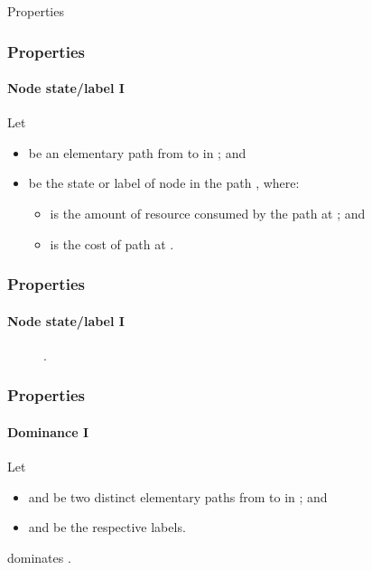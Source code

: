 \begin{frame}
  \begin{center}
    \Huge Properties
  \end{center}
\end{frame}

\begin{frame}
  \frametitle{Properties}
  \framesubtitle{Node state/label I}
  Let
  \begin{itemize}
    \item {} be an elementary path from  to  in ; and 
    \item {} be the state or label of node  in the path , where:
    \begin{itemize}
      \item {} is the amount of resource  consumed by the path  at ; and 
      \item {} is the cost of path  at .
    \end{itemize}
  \end{itemize}
\end{frame}

\begin{frame}
  \frametitle{Properties}
  \framesubtitle{Node state/label I}
  \begin{figure}[H]
    \centering
    \caption{.}
    \label{fig:vrptw_disposable_example}
  \end{figure}
\end{frame}

\begin{frame}
  \frametitle{Properties}
  \framesubtitle{Dominance I}
  Let
  \begin{itemize}
    \item {} and  be two distinct elementary paths from  to  in ; and
    \item {} and  be the respective labels.
  \end{itemize}
  \begin{definition}
     dominates .
  \end{definition}
\end{frame}

